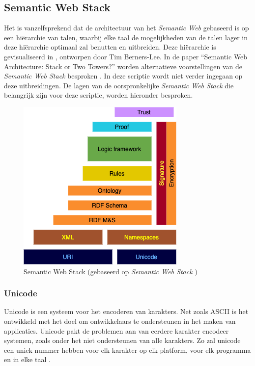 \subsection{Semantic Web Stack}
Het is vanzelfsprekend dat de architectuur van het \textit{Semantic Web} gebaseerd is op een hiërarchie van talen, waarbij elke taal de mogelijkheden van de talen lager in deze hiërarchie optimaal zal benutten en uitbreiden. Deze hiërarchie is gevisualiseerd in , ontworpen door Tim Berners-Lee. In de paper ``Semantic Web Architecture: Stack or Two Towers?'' worden alternatieve voorstellingen van de \textit{Semantic Web Stack} besproken \cite{horrocks2005semantic}. In deze scriptie wordt niet verder ingegaan op deze uitbreidingen. De lagen van de oorspronkelijke \textit{Semantic Web Stack} die belangrijk zijn voor deze scriptie, worden hieronder besproken.

\begin{figure}[ht]
    \centering
    \includegraphics[width=0.5\linewidth]{images/Semantic-Web-Stack.png}
    \caption{Semantic Web Stack (gebaseerd op \textit{Semantic Web Stack} \cite{semanticwebstack})}
    \label{fig:semantic_web_stack}
\end{figure}

\subsubsection{Unicode}
Unicode is een systeem voor het encoderen van karakters. Net zoals ASCII is het ontwikkeld met het doel om ontwikkelaars te ondersteunen in het maken van applicaties. Unicode pakt de problemen aan van eerdere karakter encodeer systemen, zoals onder het niet ondersteunen van alle karakters. Zo zal unicode een uniek nummer hebben voor elk karakter op elk platform, voor elk programma en in elke taal \cite{unicode}.

